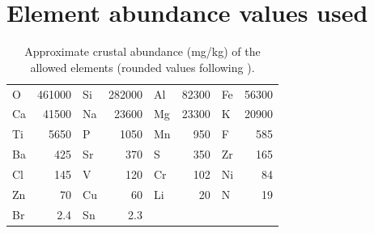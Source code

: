 \documentclass[11pt,a4paper]{article}
\begin{document}
\section{Element abundance values used}
\begin{table}[H]\centering\small\caption{Approximate crustal abundance (mg/kg) of the allowed elements (rounded values following \cite{CRC}).}\label{tab:abund}
\begin{tabular}{lrlrlrlr}\toprule O & 461000 & Si & 282000 & Al & 82300 & Fe & 56300 \\
Ca & 41500 & Na & 23600 & Mg & 23300 & K & 20900 \\
Ti & 5650 & P & 1050 & Mn & 950 & F & 585 \\
Ba & 425 & Sr & 370 & S & 350 & Zr & 165 \\
Cl & 145 & V & 120 & Cr & 102 & Ni & 84 \\
Zn & 70 & Cu & 60 & Li & 20 & N & 19 \\
Br & 2.4 & Sn & 2.3 &  &  &  &  \\
\bottomrule\end{tabular}\end{table}
\end{document}

